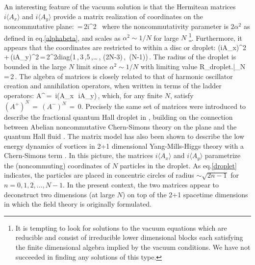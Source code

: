 An interesting feature of the vacuum solution is that the Hermitean matrices $i\langle A_x\rangle$ and $i\langle A_y\rangle$ provide a matrix realization of coordinates on the noncommutative plane:
\be
{}\,=\,2i\alpha^2 \,
\ee
where the noncommutativity parameter is $2\alpha^2$ as defined in eq.\eqref{alphabeta}, and scales as $\alpha^2\sim 1/N$ for large $N$
\footnote{ It is tempting to look for solutions to the vacuum equations which are reducible and consist of irreducible lower dimensional blocks each satisfying the finite dimensional algebra  implied by the vacuum conditions.   We have not succeeded in finding any solutions of this type.}. Furthermore, it appears that the coordinates are restricted to within a disc or droplet: 
\be
\left(i\langle A_x\rangle\right)^2\,+\,\left(i\langle A_y\rangle\right)^2\,=\,2\alpha^2{\rm diag}\left(1\,,\,3\,,5\,,\ldots\,, (2N-3)\,,\, (N-1)\right)\,.\label{droplet}
\ee
The radius of the droplet is bounded in the large $N$ limit since $\alpha^2 \sim 1/N$ with limiting value
\be
R_{\rm droplet}\left.\right|_{N\to\infty}\,=\,2\beta{}\,.
\ee
The algebra of matrices is closely related to that of harmonic oscillator creation and annihilation operators, when written in terms of the ladder operators:
\be
A^\pm\,=\, i\left(\langle A_x\rangle \,\pm\, i\langle A_y\rangle\right)\,,
\ee
which, for any finite $N$, satisfy $(A^+)^N\,=\,(A^-)^N\,=\,0$.
Precisely the same set of matrices were introduced to describe the  fractional quantum Hall droplet in \cite{hep-th/0103013}, building on the connection between Abelian noncommutative Chern-Simons theory on the plane and the quantum Hall fluid \cite{Susskind:2001fb}. The matrix model has also been shown to describe the low energy dynamics of vortices in 2+1 dimensional Yang-Mills-Higgs theory with a Chern-Simons term \cite{Tong:2003vy, Tong:2015xaa}.
In this picture, the matrices $i\langle A_x \rangle$ and $i\langle A_y\rangle $ parametrize the (noncommuting) coordinates of $N$ particles in the droplet.  As eq.\eqref{droplet} indicates, the particles are placed in concentric circles of radius $\sim \sqrt{2n-1}$ for $n=0,1,2,\ldots, N-1$. In the present context, the two matrices appear to deconstruct two dimensions (at large $N$) on top of the 2+1 spacetime dimensions in which the field theory is originally formulated. 

